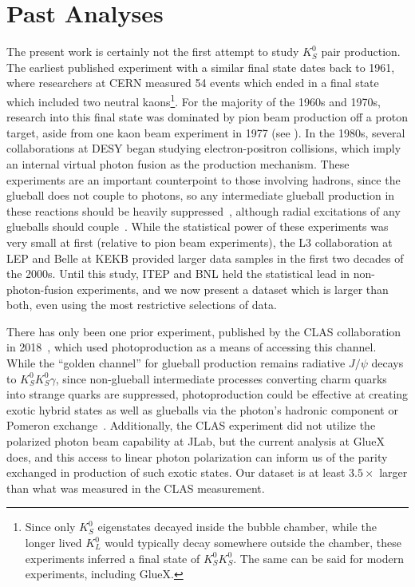 \section{Past Analyses}\label{sec:past-analyses}
The present work is certainly not the first attempt to study $K_S^0$ pair production. The earliest published experiment with a similar final state dates back to 1961, where researchers at CERN measured 54 events which ended in a final state which included two neutral kaons\footnote{Since only $K_S^0$ eigenstates decayed inside the bubble chamber, while the longer lived $K_L^0$ would typically decay somewhere outside the chamber, these experiments inferred a final state of $K_S^0K_S^0$. The same can be said for modern experiments, including GlueX.}. For the majority of the 1960s and 1970s, research into this final state was dominated by pion beam production off a proton target, aside from one kaon beam experiment in 1977 (see ). In the 1980s, several collaborations at DESY began studying electron-positron collisions, which imply an internal virtual photon fusion as the production mechanism. These experiments are an important counterpoint to those involving hadrons, since the glueball does not couple to photons, so any intermediate glueball production in these reactions should be heavily suppressed~\cite{Acciarri2001}, although radial excitations of any glueballs should couple~\cite{Mathieu2009}. While the statistical power of these experiments was very small at first (relative to pion beam experiments), the L3 collaboration at LEP and Belle at KEKB provided larger data samples in the first two decades of the 2000s. Until this study, ITEP and BNL held the statistical lead in non-photon-fusion experiments, and we now present a dataset which is larger than both, even using the most restrictive selections of data.

There has only been one prior experiment, published by the CLAS collaboration in 2018~\cite{Chandavar2018}, which used photoproduction as a means of accessing this channel. While the ``golden channel'' for glueball production remains radiative $J/\psi$ decays to $K_S^0K_S^0\gamma$, since non-glueball intermediate processes converting charm quarks into strange quarks are suppressed, photoproduction could be effective at creating exotic hybrid states as well as glueballs via the photon's hadronic component or Pomeron exchange~\cite{Mathieu2009}. Additionally, the CLAS experiment did not utilize the polarized photon beam capability at JLab, but the current analysis at GlueX does, and this access to linear photon polarization can inform us of the parity exchanged in production of such exotic states. Our dataset is at least $3.5\times$ larger than what was measured in the CLAS measurement.

